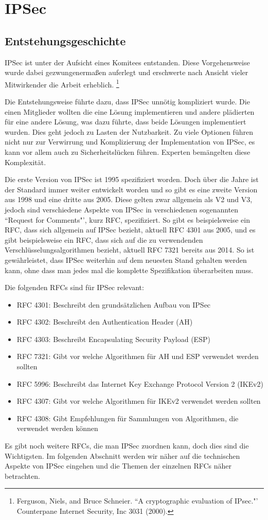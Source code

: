 \documentclass[12pt]{scrartcl}
\begin{document}
\section{IPSec}
\subsection{Entstehungsgeschichte}
IPSec ist unter der Aufsicht eines Komitees entstanden. Diese Vorgehensweise wurde dabei gezwungenermaßen auferlegt und erschwerte nach Ansicht vieler Mitwirkender die Arbeit erheblich. \footnote{Ferguson, Niels, and Bruce Schneier. ``A cryptographic evaluation of IPsec."' Counterpane Internet Security, Inc 3031 (2000).} 

Die Entstehungsweise führte dazu, dass IPSec unnötig kompliziert wurde. Die einen Mitglieder wollten die eine Lösung implementieren und andere plädierten für eine andere Lösung, was dazu führte, dass beide Lösungen implementiert wurden. Dies geht jedoch zu Lasten der Nutzbarkeit. Zu viele Optionen führen nicht nur zur Verwirrung und Komplizierung der Implementation von IPSec, es kann vor allem auch zu Sicherheitslücken führen. Experten bemängelten diese Komplexität.

Die erste Version von IPSec ist 1995 spezifiziert worden. Doch über die Jahre ist der Standard immer weiter entwickelt worden und so gibt es eine zweite Version aus 1998 und eine dritte aus 2005. Diese gelten zwar allgemein als V2 und V3, jedoch sind verschiedene Aspekte von IPSec in verschiedenen sogenannten ``Request for Comments"', kurz RFC, spezifiziert. So gibt es beispielsweise ein RFC, dass sich allgemein auf IPSec bezieht, aktuell RFC 4301 aus 2005, und es gibt beispielsweise ein RFC, dass sich auf die zu verwendenden Verschlüsselungsalgorithmen bezieht, aktuell RFC 7321 bereits aus 2014. So ist gewährleistet, dass IPSec weiterhin auf dem neuesten Stand gehalten werden kann, ohne dass man jedes mal die komplette Spezifikation überarbeiten muss.

Die folgenden RFCs sind für IPSec relevant:
\begin{itemize}
\item RFC 4301: Beschreibt den grundsätzlichen Aufbau von IPSec
\item RFC 4302: Beschreibt den Authentication Header (AH)
\item RFC 4303: Beschreibt Encapsulating Security Payload (ESP)
\item RFC 7321: Gibt vor welche Algorithmen für AH und ESP verwendet werden sollten
\item RFC 5996: Beschreibt das Internet Key Exchange Protocol Version 2 (IKEv2)
\item RFC 4307: Gibt vor welche Algorithmen für IKEv2 verwendet werden sollten
\item RFC 4308: Gibt Empfehlungen für Sammlungen von Algorithmen, die verwendet werden können
\end{itemize}
Es gibt noch weitere RFCs, die man IPSec zuordnen kann, doch dies sind die Wichtigsten. Im folgenden Abschnitt werden wir näher auf die technischen Aspekte von IPSec eingehen und die Themen der einzelnen RFCs näher betrachten.
\end{document}
